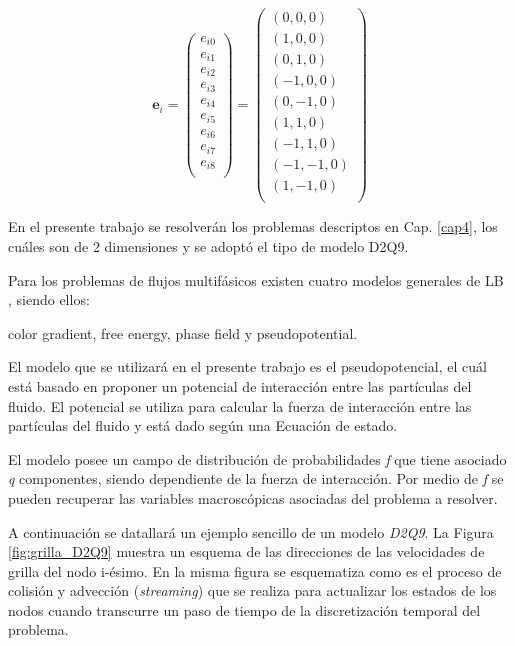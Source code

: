 \begin{equation}
{\mathbf{e}}_{i} =  
\left( \begin{array}{c} 
e_{i0} \\ e_{i1}\\ e_{i2}\\ e_{i3}\\ e_{i4}\\ e_{i5}\\
e_{i6}\\ e_{i7}\\ e_{i8}\\
\end{array}
\right) =
\left( \begin{array}{c} 
(0,0,0) \\ (1,0,0) \\ (0,1,0) \\(-1,0,0) \\ (0,-1,0) \\ (1,1,0) \\
(-1,1,0) \\ (-1,-1,0) \\ (1,-1,0)\\ 
\end{array}
\right) 
\label{eq:velgrilla}
\end{equation}




En el presente trabajo se resolverán los problemas descriptos en Cap. \ref{cap4}, los cuáles son de 2 dimensiones y se adoptó el tipo de modelo D2Q9. 



Para los problemas de flujos multifásicos existen cuatro modelos generales de LB , siendo ellos:

\qquad \qquad color gradient, free energy, phase field y pseudopotential.

El modelo que se utilizará en el presente trabajo es el pseudopotencial, el cuál está basado en proponer un potencial de interacción entre las partículas del fluido. El potencial se utiliza para calcular la fuerza de interacción entre las partículas del fluido y está dado según una Ecuación de estado. 

El modelo posee un campo de distribución de probabilidades \textit{f} que tiene asociado \textit{q} componentes, siendo dependiente de la fuerza de interacción. Por medio de \textit{f} se pueden recuperar las variables macroscópicas asociadas del problema a resolver.

A continuación se datallará un ejemplo sencillo de un modelo \textit{D2Q9}. La Figura \ref{fig:grilla_D2Q9} muestra un esquema de las direcciones de las velocidades de grilla del nodo i-ésimo. En la misma figura se esquematiza como  es el proceso de colisión y advección (\textit{streaming}) que se realiza para actualizar los estados de los nodos cuando transcurre un paso de tiempo de la discretización temporal del problema. 



